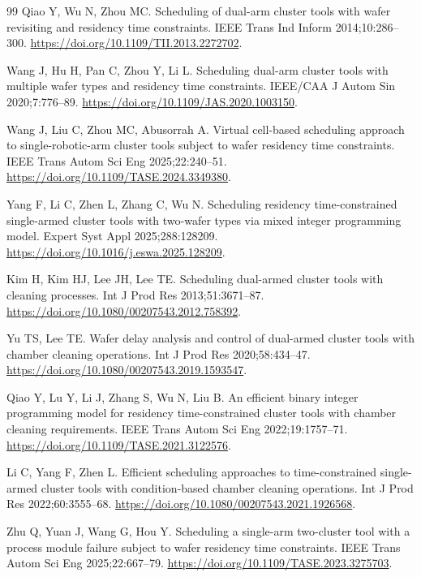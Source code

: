 \documentclass[final,5p,times,twocolumn]{elsarticle}
\begin{document}
\begin{thebibliography}{99}
Qiao Y, Wu N, Zhou MC. Scheduling of dual-arm cluster tools with wafer revisiting and residency time constraints.
IEEE Trans Ind Inform 2014;10:286--300.
\url{https://doi.org/10.1109/TII.2013.2272702}.

Wang J, Hu H, Pan C, Zhou Y, Li L. Scheduling dual-arm cluster tools with multiple wafer types and residency time constraints.
IEEE/CAA J Autom Sin 2020;7:776--89.
\url{https://doi.org/10.1109/JAS.2020.1003150}.

Wang J, Liu C, Zhou MC, Abusorrah A. Virtual cell-based scheduling approach to single-robotic-arm cluster tools subject to wafer residency time constraints.
IEEE Trans Autom Sci Eng 2025;22:240--51.
\url{https://doi.org/10.1109/TASE.2024.3349380}.

Yang F, Li C, Zhen L, Zhang C, Wu N. Scheduling residency time-constrained single-armed cluster tools with two-wafer types via mixed integer programming model.
Expert Syst Appl 2025;288:128209.
\url{https://doi.org/10.1016/j.eswa.2025.128209}.

Kim H, Kim HJ, Lee JH, Lee TE. Scheduling dual-armed cluster tools with cleaning processes.
Int J Prod Res 2013;51:3671--87.
\url{https://doi.org/10.1080/00207543.2012.758392}.

Yu TS, Lee TE. Wafer delay analysis and control of dual-armed cluster tools with chamber cleaning operations.
Int J Prod Res 2020;58:434--47.
\url{https://doi.org/10.1080/00207543.2019.1593547}.

Qiao Y, Lu Y, Li J, Zhang S, Wu N, Liu B. An efficient binary integer programming model for residency time-constrained cluster tools with chamber cleaning requirements.
IEEE Trans Autom Sci Eng 2022;19:1757--71.
\url{https://doi.org/10.1109/TASE.2021.3122576}.

Li C, Yang F, Zhen L. Efficient scheduling approaches to time-constrained single-armed cluster tools with condition-based chamber cleaning operations.
Int J Prod Res 2022;60:3555--68.
\url{https://doi.org/10.1080/00207543.2021.1926568}.

Zhu Q, Yuan J, Wang G, Hou Y. Scheduling a single-arm two-cluster tool with a process module failure subject to wafer residency time constraints.
IEEE Trans Autom Sci Eng 2025;22:667--79.
\url{https://doi.org/10.1109/TASE.2023.3275703}.


\end{thebibliography}
\end{document}
